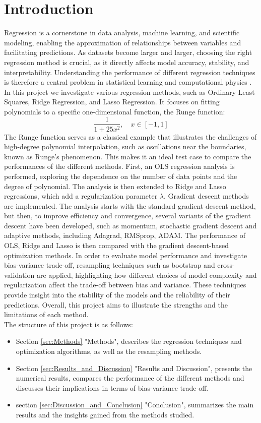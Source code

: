 \documentclass[
 reprint,            %
 amsmath,amssymb,
 aps,
]{revtex4-2}
\begin{document}
\section{Introduction}
\label{sec:Introduction}
Regression is a cornerstone in data analysis, machine learning, and scientific modeling, enabling the approximation of relationships between variables and facilitating predictions.
As datasets become larger and larger, choosing the right regression method is crucial, as it directly affects model accuracy, stability, and interpretability\cite{mehta2019highbias}.
Understanding the performance of different regression techniques is therefore a central problem in statistical learning and computational physics \cite{aiken2021framework}.
In this project we investigate various regression methods, such as Ordinary Least Squares, Ridge Regression, and Lasso Regression.
It focuses on fitting polynomials to a specific one-dimensional function, the Runge function:
\[
\frac{1}{1+25x^2}, \quad x\in[-1, 1]
\]
The Runge function serves as a classical example that illustrates the challenges of high-degree polynomial interpolation, such as oscillations near the boundaries, known as Runge's phenomenon\cite{runge1901}. This makes it an ideal test case to compare the performances of the different methods.
First, an OLS regression analysis is performed, exploring the dependence on the number of data points and the degree of polynomial. The analysis is then extended to Ridge and Lasso regressions, which add a regularization parameter ${\lambda}$. Gradient descent methods are implemented.
The analysis starts with the standard gradient descent method, but then, to improve efficiency and convergence, several variants of the gradient descent have been developed, such as momentum, stochastic gradient descent and adaptive methods, including Adagrad, RMSprop, ADAM.
The performance of OLS, Ridge and Lasso is then compared with the gradient descent-based optimization methods.
In order to evaluate model performance and investigate bias-variance trade-off, resampling techniques such as bootstrap and cross-validation are applied, highlighting how different choices of model complexity and regularization affect the trade-off between bias and variance.
These techniques provide insight into the stability of the models and the reliability of their predictions. 
Overall, this project aims to illustrate the strengths and the limitations of each method.\\
The structure of this project is as follows: 
\begin{itemize}
    \item Section \ref{sec:Methods} "Methods", describes the regression techniques and optimization algorithms, as well as the resampling methods.
    \item Section \ref{sec:Results_and_Discussion} "Results and Discussion", presents the numerical results, compares the performance of the different methods and discusses their implications in terms of bias-variance trade-off.
    \item section \ref{sec:Discussion_and_Conclusion} "Conclusion", summarizes the main results and the insights gained from the methods studied.
\end{itemize}
\end{document}
